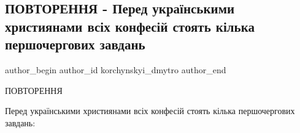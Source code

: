  
 
 
 
 
 
\subsection{ПОВТОРЕННЯ - Перед українськими християнами всіх конфесій стоять кілька першочергових завдань}
\label{sec:03_12_2020.fb.korchynskyi_dmytro.1.zavdannja_hristiane}
\ifcmt
	author_begin
   author_id korchynskyi_dmytro
	author_end
\fi


ПОВТОРЕННЯ

Перед українськими християнами всіх конфесій стоять кілька першочергових завдань:

